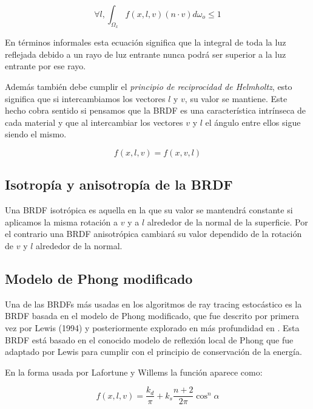 \begin{equation}
\forall l, \int_{\Omega_x} f(x,l,v) (n \cdot v) d\omega_o \leq 1
\end{equation}

En términos informales esta ecuación significa que la integral de toda la luz reflejada debido a un rayo de luz entrante nunca podrá ser superior a la luz entrante por ese rayo.

\medskip
Además también debe cumplir el \emph{principio de reciprocidad de Helmholtz}, esto significa que si intercambiamos los vectores $l$ y $v$, su valor se mantiene. Este hecho cobra sentido si pensamos que la BRDF es una característica intrínseca de cada material y que al intercambiar los vectores $v$ y $l$ el ángulo entre ellos sigue siendo el mismo.

\begin{equation}
f(x, l, v) = f(x, v, l)
\end{equation} 

\subsection{Isotropía y anisotropía de la BRDF}

Una BRDF isotrópica es aquella en la que su valor se mantendrá constante si aplicamos la misma rotación a $v$ y a $l$ alrededor de la normal de la superficie. Por el contrario una BRDF anisotrópica cambiará su valor dependido de la rotación de $v$ y $l$ alrededor de la normal.

\clearpage

\subsection{Modelo de Phong modificado}
Una de las BRDFs más usadas en los algoritmos de ray tracing estocástico es la BRDF basada en el modelo de Phong modificado, que fue descrito por primera vez por Lewis (1994) \nocite{Lewis1994} y posteriormente explorado en más profundidad en \cite{Lafortune1994}. Esta BRDF está basado en el conocido modelo de reflexión local de Phong \cite{Phong1975} que fue adaptado por Lewis para cumplir con el principio de conservación de la energía.

En la forma usada por Lafortune y Willems la función aparece como:

\begin{equation}
f(x, l, v) = \frac{k_d}{\pi} + k_s \frac{n + 2}{2 \pi} \cos^n\alpha
\end{equation}

